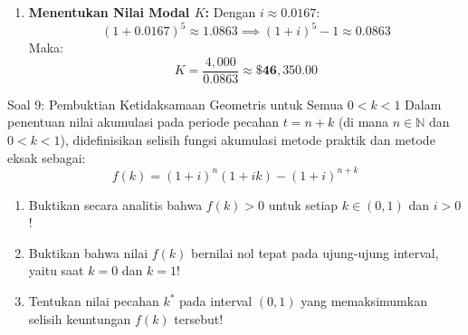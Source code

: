 \documentclass[11pt,a4paper]{article}
\begin{document}
\begin{solutionbox}[Soal 8]
\begin{enumerate}[label=(\alph*)]
    \item \textbf{Menentukan Nilai Modal $K$:}
    Dengan $i \approx 0.0167$:
    \begin{equation*}
        (1 + 0.0167)^5 \approx 1.0863 \implies (1+i)^5 - 1 \approx 0.0863
    \end{equation*}
    Maka:
    \begin{equation*}
        K = \frac{4{,}000}{0.0863} \approx \mathbf{\$46{,}350.00}
    \end{equation*}
\end{enumerate}
\end{solutionbox}

\vspace{1.2em}

\begin{problembox}{Soal 9: Pembuktian Ketidaksamaan Geometris untuk Semua $0 < k < 1$}
Dalam penentuan nilai akumulasi pada periode pecahan $t = n + k$ (di mana $n \in \mathbb{N}$ dan $0 < k < 1$), didefinisikan selisih fungsi akumulasi metode praktik dan metode eksak sebagai:
\begin{equation*}
    f(k) = (1 + i)^n (1 + ik) - (1 + i)^{n+k}
\end{equation*}
\begin{enumerate}[label=(\alph*)]
    \item Buktikan secara analitis bahwa $f(k) > 0$ untuk setiap $k \in (0, 1)$ dan $i > 0$!
    \item Buktikan bahwa nilai $f(k)$ bernilai nol tepat pada ujung-ujung interval, yaitu saat $k = 0$ dan $k = 1$!
    \item Tentukan nilai pecahan $k^*$ pada interval $(0, 1)$ yang memaksimumkan selisih keuntungan $f(k)$ tersebut!
\end{enumerate}
\end{problembox}
\end{document}
